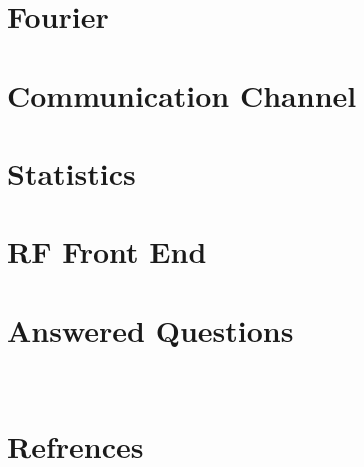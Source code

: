 \documentclass{article}
\numberwithin{equation}{section}%
\begin{document}
\pagecolor{mainTheme}\afterpage{\pagecolor{backCirc}}
\maketitle
\thispagestyle{empty}



\newcommand{\TonDpage}[1]{
  \newpage
  \renewcommand{\Places}{#1}
}


\TonDpage{Fourier}
\vspace*{-0.5 em}
\section{Fourier}

\vspace{10pt}


\vspace*{-0.5 em}
\section{Communication Channel}

\vspace{30pt}


\vspace*{-0.5 em}
\section{Statistics}

\vspace{10pt}

\vspace*{-0.5 em}
\section{RF Front End}

\vspace{10pt}


\section{Answered Questions}


~\\%
\section{Refrences}\vspace{0.5em}

\end{document}

